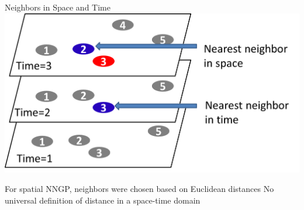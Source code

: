 \begin{frame}{Neighbors in Space and Time}
	\centering \includegraphics[scale=0.3]{../figures/stnn.png}
	\begin{itemize}
		\myitem For spatial NNGP, neighbors were chosen based on Euclidean distances
		\myitem No universal definition of distance in a space-time domain
	\end{itemize}
\end{frame}

